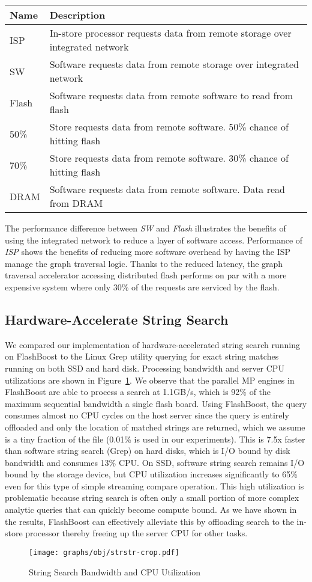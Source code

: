 \begin{tabular}{l | p{0.25\paperwidth}}
\label{tab:graph}
Name & Description \\
\hline \hline
ISP & In-store processor requests data from remote storage over integrated network \\
SW & Software requests data from remote storage over integrated network \\
Flash & Software requests data from remote software to read from flash \\
50\% & Store requests data from remote software. 50\% chance of hitting flash \\
70\% & Store requests data from remote software. 30\% chance of hitting flash \\
DRAM & Software requests data from remote software. Data read from DRAM \\
\hline
\end{tabular}

The performance difference between \emph{SW} and \emph{Flash} illustrates the
benefits of using the integrated network to reduce a layer of software access.
Performance of \emph{ISP} shows the benefits of reducing more software overhead
by having the ISP manage the graph traversal logic. Thanks to the reduced
latency, the graph traversal accelerator accessing distributed flash performs on
par with a more expensive system where only 30\% of the requests are serviced by
the flash.



\subsection{Hardware-Accelerate String Search}

We compared our implementation of hardware-accelerated string search running on
FlashBoost to the Linux Grep utility querying for exact string matches running
on both SSD and hard disk. Processing bandwidth and server CPU utilizations are
shown in Figure~\ref{fig:result_strstr}. We observe that the parallel MP
engines in FlashBoost are able to process a search at 1.1GB/s, which is 92\% of
the maximum sequential bandwidth a single flash board. Using FlashBoost, the
query consumes almost no CPU cycles on the host server since the query is
entirely offloaded and only the location of matched strings are returned, which
we assume is a tiny fraction of the file (0.01\% is used in our experiments).
This is 7.5x faster than software string search (Grep) on hard disks, which is
I/O bound by disk bandwidth and consumes 13\% CPU. On SSD, software string
search remains I/O bound by the storage device, but CPU utilization increases
significantly to 65\% even for this type of simple streaming compare operation.
This high utilization is problematic because string search is often only a small portion 
of more complex analytic queries that can quickly become compute bound.  As we
have shown in the results, FlashBoost can effectively alleviate this by
offloading search to the in-store processor thereby freeing up the server CPU
for other tasks. 

\begin{figure}[b]
	\centering
	\texttt{[image: graphs/obj/strstr-crop.pdf]}
	\caption{String Search Bandwidth and CPU Utilization}
	\label{fig:result_strstr}
\end{figure}
 

